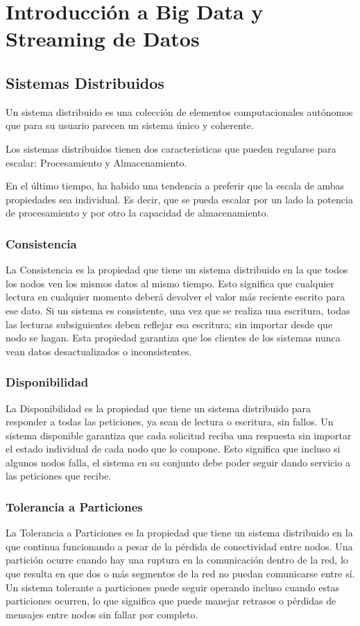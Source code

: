 \section{Introducción a Big Data y Streaming de Datos}

\subsection{Sistemas Distribuidos}
Un sistema distribuido es una colección de elementos computacionales autónomos que para su usuario 
parecen un sistema único y coherente. \parencite{tanenbaum}

Los sistemas distribuidos tienen dos caracteristicas que pueden regularse para escalar: Procesamiento y Almacenamiento. 
\newline

En el último tiempo, ha habido una tendencia a preferir que la escala de ambas propiedades sea individual. 
Es decir, que se pueda escalar por un lado la potencia de procesamiento y por otro la capacidad de almacenamiento.

\subsubsection{Consistencia}
La Consistencia es la propiedad que tiene un sistema distribuido en la que todos los nodos ven los mismos datos al mismo tiempo.
Esto significa que cualquier lectura en cualquier momento deberá devolver el valor más reciente escrito para ese dato.
Si un sistema es consistente, una vez que se realiza una escritura, todas las lecturas subsiguientes deben reflejar esa escritura;
sin importar desde que nodo se hagan. 
Esta propiedad garantiza que los clientes de los sistemas nunca vean datos desactualizados o inconsistentes.
\newpage
\subsubsection{Disponibilidad}
La Disponibilidad es la propiedad que tiene un sistema distribuido para responder a todas las peticiones, ya sean de lectura o escritura, sin fallos.
Un sistema disponible garantiza que cada solicitud reciba una respuesta sin importar el estado individual de cada nodo que lo compone.
Esto significa que incluso si algunos nodos falla, el sistema en su conjunto debe poder seguir dando servicio a las peticiones que recibe.
\subsubsection{Tolerancia a Particiones}
La Tolerancia a Particiones es la propiedad que tiene un sistema distribuido en la que continua funcionando a pesar de la pérdida de 
conectividad entre nodos. Una partición ocurre cuando hay una ruptura en la comunicación dentro de la red, 
lo que resulta en que dos o más segmentos de la red no puedan comunicarse entre sí.
Un sistema tolerante a particiones puede seguir operando incluso cuando estas particiones ocurren, 
lo que significa que puede manejar retrasos o pérdidas de mensajes entre nodos sin fallar por completo. 

